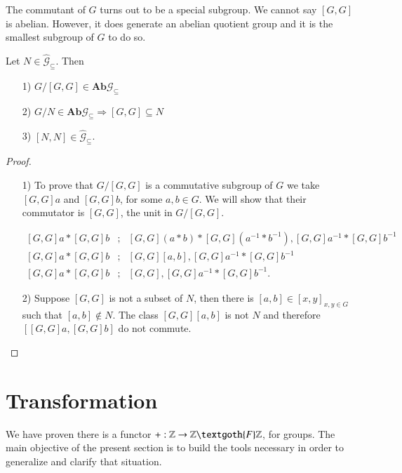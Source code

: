 \documentclass [12pt]{book}
\begin{document}
The commutant of $G$ turns out to be a special subgroup. We cannot say $[G,G]$ is abelian. However, it does generate an abelian quotient group and it is the smallest subgroup of $G$ to do so.

\begin{theorem}Let $N\in\hat{\mathcal{G}}_{\subseteq}$. Then\begin{itemize}\item[1)] $G/[G,G]\in\textbf{Ab}\mathcal{G}_{\subseteq}$\item[2)]$G/N\in\textbf{Ab}
\mathcal{G}_{\subseteq}\Rightarrow[G,G]\subseteq N$\item[3)]$[N,N]\in\hat{\mathcal{G}}_{\subseteq}$.\end{itemize}\end{theorem}

	\begin{proof}\makebox[5pt][]{}\mbox {}
	
		\begin{itemize}

\item[1)] To prove that $G/[G,G]$ is a commutative subgroup of $G$ we take $[G,G]a$ and $[G,G]b$, for some $a,b\in G$. We will show that their commutator is $[G,G]$, the unit in $G/[G,G]$.

\begin{eqnarray}\nonumber[G,G]a*[G,G]b&;&[G,G](a*b)*[G,G](a^{-1}*b^{-1}),[G,G]a^{-1}*[G,G]b^{-1}\\\nonumber[G,G]a*[G,G]b&;&[G,G][a,b],[G,G]a^{-1}*[G,G]b^{-1}\\\nonumber[G,G]a*[G,G]b&;&[G,G],[G,G]a^{-1}*[G,G]b^{-1}.\end{eqnarray}

\item[2)]Suppose $[G,G]$ is not a subset of $N$, then there is $[a,b]\in[x,y]_{x,y\in G}$ such that $[a,b]\notin N$. The class $[G,G][a,b]$ is not $N$ and therefore $[[G,G]a,[G,G]b]$ do not commute.

		\end{itemize}

	\end{proof}








\section{Transformation}

We have proven there is a functor $+:\mathbb{Z}\rightarrow\mathbb{Z}\textgoth{F}\mathbb{Z}$, for groups. The main objective of the present section is to build the tools necessary in order to generalize and clarify that situation.
\end{document}
